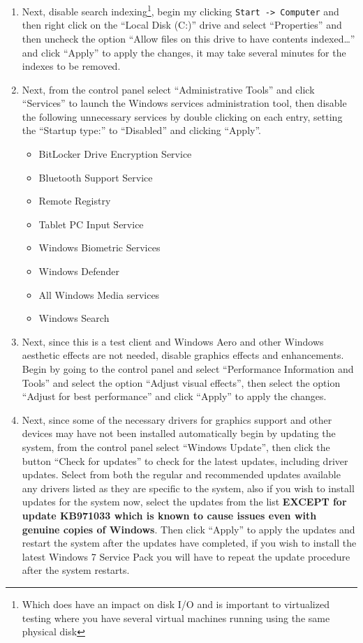 \begin{enumerate}
\item	Next, disable search indexing\footnote{Which does have an impact on disk I/O and is important to virtualized testing where you have
		several virtual machines running using the same physical disk}, begin my clicking \verb|Start -> Computer| and then right click 
		on the 	``Local Disk (C:)'' drive and select ``Properties'' and then uncheck the option ``Allow files on this drive to have contents
		indexed\ldots{}'' and click ``Apply'' to apply the changes, it may take several minutes for the indexes to be removed.
		
\item	Next, from the control panel select ``Administrative Tools'' and click ``Services'' to launch the Windows services administration tool,
		then disable the following unnecessary services by double clicking on each entry, setting the ``Startup type:'' to ``Disabled'' and
		clicking ``Apply''.
\begin{itemize}
\item	BitLocker Drive Encryption Service
\item	Bluetooth Support Service
\item	Remote Registry
\item	Tablet PC Input Service
\item	Windows Biometric Services
\item	Windows Defender
\item	All Windows Media services
\item	Windows Search
\end{itemize}

\item	Next, since this is a test client and Windows Aero and other Windows aesthetic effects are not needed, disable graphics effects and
		enhancements. Begin by going to the control panel and select ``Performance Information and Tools'' and select the option ``Adjust
		visual effects'', then select the option ``Adjust for best performance'' and click ``Apply'' to apply the changes.
		
\item	Next, since some of the necessary drivers for graphics support and other devices may have not been installed automatically begin
		by updating the system, from the control panel select ``Windows Update'', then click the button ``Check for updates'' to check
		for the latest updates, including driver updates. Select from both the regular and recommended updates available any drivers
		listed as they are specific to the system, also if you wish to install updates for the system now, select the updates from the
		list {\bf EXCEPT for update KB971033 which is known to cause issues even with genuine copies of Windows}. Then click ``Apply'' 
		to apply the updates and restart the system after the updates have completed, if you wish to install the latest Windows 7 Service
		Pack you will have to repeat the update procedure after the system restarts.
		

\end{enumerate}
